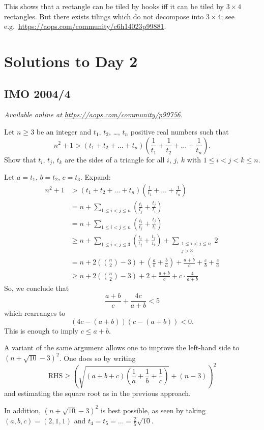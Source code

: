 \documentclass[11pt]{scrartcl}
\begin{document}
\begin{remark*}
  This shows that a rectangle can be tiled by hooks
  iff it can be tiled by $3 \times 4$ rectangles.
  But there exists tilings which do not decompose into $3 \times 4$;
  see e.g.\ \url{https://aops.com/community/c6h14023p99881}.
\end{remark*}
\pagebreak

\section{Solutions to Day 2}
\subsection{IMO 2004/4}
\textsl{Available online at \url{https://aops.com/community/p99756}.}
\begin{mdframed}[style=mdpurplebox,frametitle={Problem statement}]
Let $n \ge 3$ be an integer
and $t_1$, $t_2$, \dots, $t_n$ positive real numbers such that
\[ n^2+1 > \left(t_1 + t_2 + \dots + t_n\right)
  \left( \frac{1}{t_1} + \frac{1}{t_2} + \dots + \frac{1}{t_n} \right). \]
Show that $t_i$, $t_j$, $t_k$ are the sides of a triangle
for all $i$, $j$, $k$ with $1 \le i < j < k \le n$.
\end{mdframed}
Let $a = t_1$, $b = t_2$, $c = t_3$.
Expand:
\begin{align*}
  n^2+1 &> \left(t_1 + t_2 + \dots + t_n\right)
    \left( \frac{1}{t_1} + \dots + \frac{1}{t_n} \right) \\
  &= n + \sum_{1 \le i < j \le n}
    \left( \frac{t_i}{t_j} + \frac{t_j}{t_i} \right) \\
  &= n + \sum_{1 \le i < j \le n}
    \left( \frac{t_i}{t_j} + \frac{t_j}{t_i} \right) \\
  &\ge n + \sum_{1 \le i < j \le 3}
    \left( \frac{t_i}{t_j} + \frac{t_j}{t_i} \right)
    + \sum_{\substack{1 \le i < j \le n \\ j > 3 }} 2 \\
  &= n + 2\left( \binom n2-3 \right)
    + \left( \frac ab + \frac ba \right)
    + \frac{a+b}{c} + \frac{c}{b} + \frac{c}{a} \\
  &\ge n + 2\left( \binom n2-3 \right) + 2
    + \frac{a+b}{c} + c \cdot \frac{4}{a+b}
\end{align*}
So, we conclude that
\[ \frac{a+b}{c} + \frac{4c}{a+b} < 5 \]
which rearranges to
\[ \left( 4c-(a+b) \right)\left( c-(a+b) \right) < 0. \]
This is enough to imply $c \le a+b$.

\begin{remark*}
  A variant of the same argument allows one to improve
  the left-hand side to $(n+\sqrt{10}-3)^2$.
  One does so by writing
  \[ \text{RHS} \ge \left( \sqrt{\left( a+b+c \right)
    \left( \frac1a+\frac1b+\frac1c \right)} + (n-3) \right)^2 \]
  and estimating the square root as in the previous approach.

  In addition, $(n+\sqrt{10}-3)^2$ is best possible,
  as seen by taking $(a,b,c) = (2,1,1)$
  and $t_4 = t_5 = \dots = \frac25 \sqrt{10}$.
\end{remark*}
\pagebreak
\end{document}

